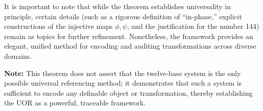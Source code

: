 \documentclass{article}
\begin{document}
It is important to note that while the theorem establishes universality in principle, certain details (such as a rigorous definition of ``in-phase,'' explicit constructions of the injective maps $\phi,\psi$, and the justification for the number 144) remain as topics for further refinement. Nonetheless, the framework provides an elegant, unified method for encoding and auditing transformations across diverse domains.

\bigskip
\noindent \textbf{Note:} This theorem does not assert that the twelve-base system is the only possible universal referencing method; it demonstrates that such a system is sufficient to encode any definable object or transformation, thereby establishing the UOR as a powerful, traceable framework.
\end{document}

